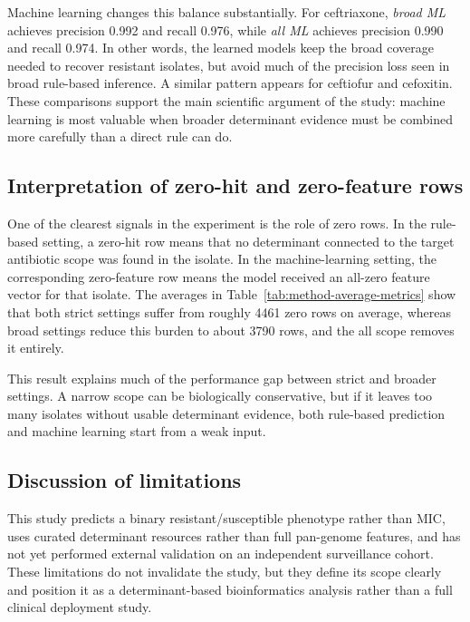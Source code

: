 Machine learning changes this balance substantially. For ceftriaxone, \textit{broad ML} achieves precision 0.992 and recall 0.976, while \textit{all ML} achieves precision 0.990 and recall 0.974. In other words, the learned models keep the broad coverage needed to recover resistant isolates, but avoid much of the precision loss seen in broad rule-based inference. A similar pattern appears for ceftiofur and cefoxitin. These comparisons support the main scientific argument of the study: machine learning is most valuable when broader determinant evidence must be combined more carefully than a direct rule can do.

\subsection{Interpretation of zero-hit and zero-feature rows}

One of the clearest signals in the experiment is the role of zero rows. In the rule-based setting, a zero-hit row means that no determinant connected to the target antibiotic scope was found in the isolate. In the machine-learning setting, the corresponding zero-feature row means the model received an all-zero feature vector for that isolate. The averages in Table~\ref{tab:method-average-metrics} show that both strict settings suffer from roughly 4461 zero rows on average, whereas broad settings reduce this burden to about 3790 rows, and the all scope removes it entirely.

This result explains much of the performance gap between strict and broader settings. A narrow scope can be biologically conservative, but if it leaves too many isolates without usable determinant evidence, both rule-based prediction and machine learning start from a weak input.

\subsection{Discussion of limitations}

This study predicts a binary resistant/susceptible phenotype rather than MIC, uses curated determinant resources rather than full pan-genome features, and has not yet performed external validation on an independent surveillance cohort. These limitations do not invalidate the study, but they define its scope clearly and position it as a determinant-based bioinformatics analysis rather than a full clinical deployment study.
